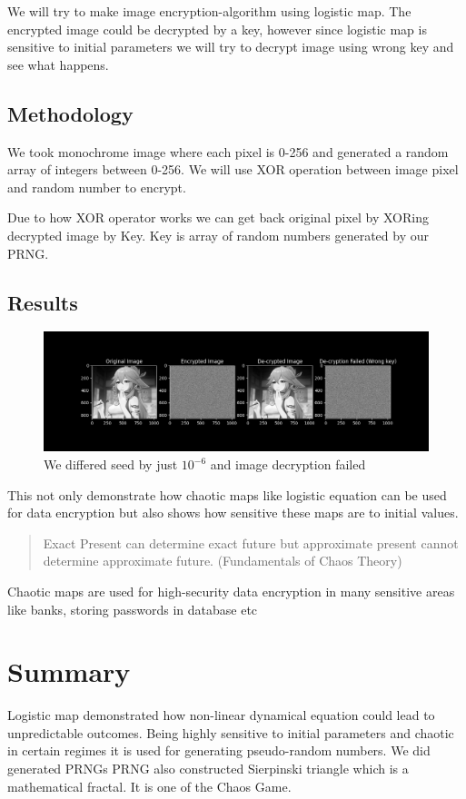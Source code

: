 \documentclass{report}
\begin{document}
We will try to make image encryption-algorithm using logistic map. The encrypted image could be decrypted by a key, however since logistic map is sensitive to initial parameters we will try to decrypt image using wrong key and see what happens.

\subsection{Methodology}

We took monochrome image where each pixel is 0-256 and generated a random array of integers between 0-256. We will use XOR operation between image pixel and random number to encrypt.

Due to how XOR operator works we can get back original pixel by XORing decrypted image by Key. Key is array of random numbers generated by our PRNG.

\subsection{Results}

\begin{figure}[!h]
    \centering
    \includegraphics[scale=.4]{images/imageed.png}
    \caption{We differed seed by just $10^{-6}$ and image decryption failed}
    \label{fig:my_labelVenti}
\end{figure}
This not only demonstrate how chaotic maps like logistic equation can be used for data encryption but also shows how sensitive these maps are to initial values.
\begin{quote}
Exact Present can determine exact future but approximate present cannot determine approximate future.  (Fundamentals of Chaos Theory)
\end{quote}

Chaotic maps are used for high-security data encryption in many sensitive areas like banks, storing passwords in database etc


\newpage
\section{Summary}
Logistic map demonstrated how non-linear dynamical equation could lead to unpredictable outcomes. Being highly sensitive to  initial parameters and chaotic in certain regimes it is used for generating pseudo-random numbers. We did generated PRNGs
\newline
PRNG also constructed Sierpinski triangle which is a mathematical fractal. It is one of the Chaos Game.
\end{document}
